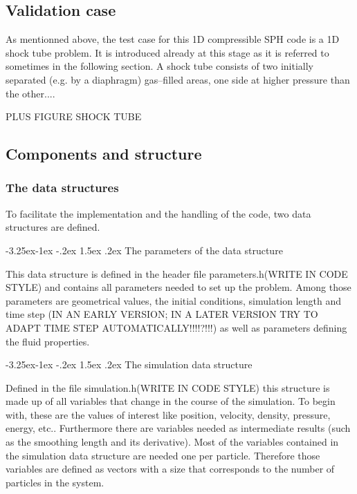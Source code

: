 \documentclass{report}
\makeatletter
\renewcommand\paragraph{\@startsection{paragraph}{4}{\z@}%
  {-3.25ex\@plus -1ex \@minus -.2ex}%
  {1.5ex \@plus .2ex}%
  {\normalfont\normalsize\bfseries}}
\makeatother
\begin{document}
\subsection{Validation case}
As mentionned above, the test case for this 1D compressible SPH code is a 1D shock tube 
problem. It is introduced already at this stage as it is referred to sometimes in the 
following section.
A shock tube consists of two initially separated (e.g. by a diaphragm) gas--filled areas,
one side at higher pressure than the other....

PLUS FIGURE SHOCK TUBE

\subsection{Components and structure}


\subsubsection{The data structures}

To facilitate the implementation and the handling of the code, two data structures are defined. 

\paragraph{The parameters of the data structure}

This data structure is defined in the header file parameters.h(WRITE IN CODE STYLE) and 
contains all parameters needed to set up the problem. Among those parameters are 
geometrical values, the initial conditions, simulation length and time step 
(IN AN EARLY VERSION; IN A LATER VERSION TRY TO ADAPT TIME STEP AUTOMATICALLY!!!!?!!!) 
as well as parameters defining the fluid properties.

\paragraph{The simulation data structure}

Defined in the file simulation.h(WRITE IN CODE STYLE) this structure is made up of all 
variables that change in the course of the simulation. To begin with, these are the 
values of interest like position, velocity, density, pressure, energy, etc.. 
Furthermore there are variables needed as intermediate results (such as the smoothing 
length and its derivative). 
Most of the variables contained in the simulation data structure are needed one per 
particle. Therefore those variables are defined as vectors with a size that corresponds 
to the number of particles in the system. 
\end{document}
